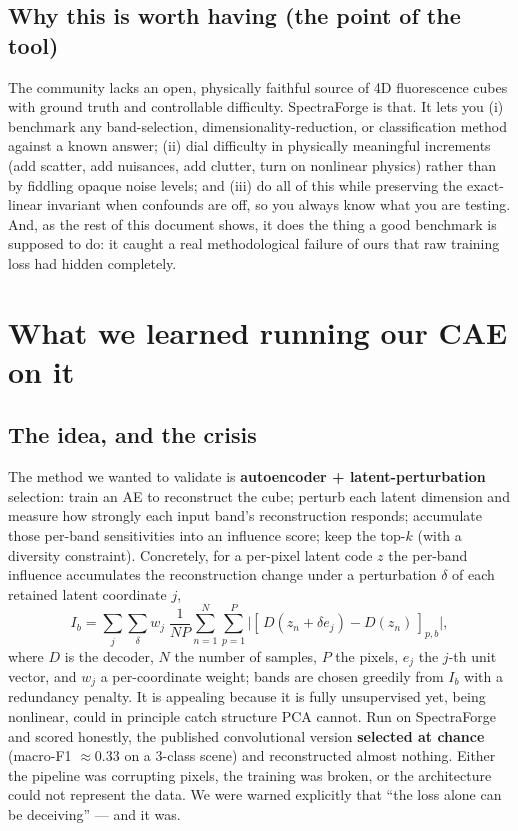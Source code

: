 \documentclass[11pt]{article}
\begin{document}
\subsection{Why this is worth having (the point of the tool)}
The community lacks an open, physically faithful source of 4D fluorescence cubes with ground truth
and controllable difficulty. SpectraForge is that. It lets you (i) benchmark any band-selection,
dimensionality-reduction, or classification method against a known answer; (ii) dial difficulty in
physically meaningful increments (add scatter, add nuisances, add clutter, turn on nonlinear
physics) rather than by fiddling opaque noise levels; and (iii) do all of this while preserving the
exact-linear invariant when confounds are off, so you always know what you are testing. And, as the
rest of this document shows, it does the thing a good benchmark is supposed to do: it caught a real
methodological failure of ours that raw training loss had hidden completely.

\section{What we learned running our CAE on it}

\subsection{The idea, and the crisis}
The method we wanted to validate is \textbf{autoencoder + latent-perturbation} selection: train an
AE to reconstruct the cube; perturb each latent dimension and measure how strongly each input band's
reconstruction responds; accumulate those per-band sensitivities into an influence score; keep the
top-$k$ (with a diversity constraint). Concretely, for a per-pixel latent code $z$ the per-band
influence accumulates the reconstruction change under a perturbation $\delta$ of each retained latent
coordinate $j$,
\begin{equation}
I_b=\sum_{j}\sum_{\delta} w_j\;\frac{1}{NP}\sum_{n=1}^{N}\sum_{p=1}^{P}
\big|[\,D(z_n+\delta e_j)-D(z_n)\,]_{p,b}\big|,
\end{equation}
where $D$ is the decoder, $N$ the number of samples, $P$ the pixels, $e_j$ the $j$-th unit vector, and
$w_j$ a per-coordinate weight; bands are chosen greedily from $I_b$ with a redundancy penalty. It is
appealing because it is fully unsupervised yet, being
nonlinear, could in principle catch structure PCA cannot. Run on SpectraForge and scored honestly,
the published convolutional version \textbf{selected at chance} (macro-F1 $\approx 0.33$ on a 3-class
scene) and reconstructed almost nothing. Either the pipeline was corrupting pixels, the training was
broken, or the architecture could not represent the data. We were warned explicitly that ``the loss
alone can be deceiving'' --- and it was.
\end{document}
